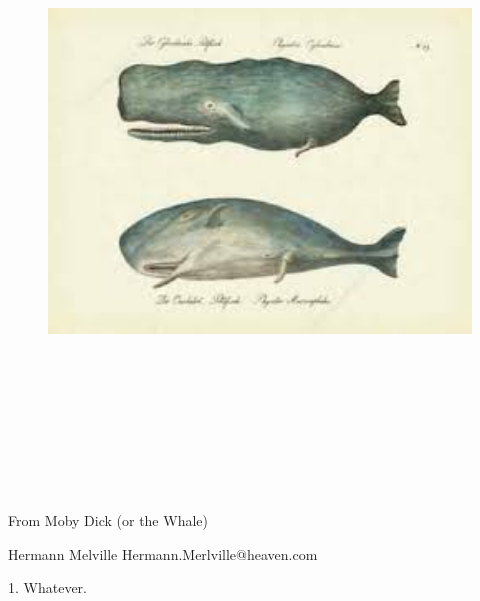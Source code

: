 \documentclass[final]{beamer}
\begin{document}
  \begin{frame}{} 
  
\begin{figure}
\includegraphics[height=17.0cm]{whale_3.jpeg}
\end{figure}

    
\begin{block}
{\huge
From Moby Dick (or the Whale)
\medskip}

{\large
Hermann Melville
\hfill Hermann.Merlville@heaven.com}
\vspace*{5mm}

\end{block}

\begin{block}
{\large 1. Whatever. }

\begin{columns}


\end{columns}
\end{block}
\end{frame}
\end{document}

